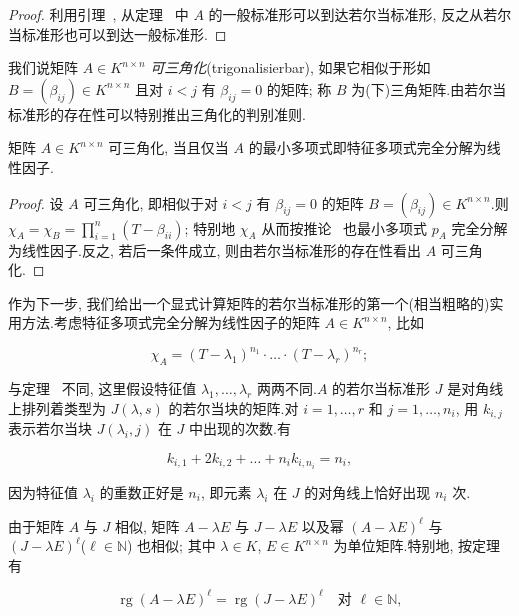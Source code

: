 \begin{proof}
利用引理~, 从定理~ 中 $A$ 的一般标准形可以到达若尔当标准形, 反之从若尔当标准形也可以到达一般标准形.
\end{proof}

我们说矩阵 $A \in K^{n \times n}$ \emph{可三角化}(\textup{trigonalisierbar}), 如果它相似于形如 $B = (\beta_{ij}) \in K^{n \times n}$ 且对 $i < j$ 有 $\beta_{ij} = 0$ 的矩阵; 称 $B$ 为(下)三角矩阵.由若尔当标准形的存在性可以特别推出三角化的判别准则.

\begin{corollary}\label{cor:6.5.16}
矩阵 $A \in K^{n \times n}$ 可三角化, 当且仅当 $A$ 的最小多项式即特征多项式完全分解为线性因子.
\end{corollary}

\begin{proof}
设 $A$ 可三角化, 即相似于对 $i < j$ 有 $\beta_{ij} = 0$ 的矩阵 $B = (\beta_{ij}) \in K^{n \times n}$.则 $\chi_A = \chi_B = \prod_{i = 1}^{n}(T - \beta_{ii})$; 特别地 $\chi_A$ 从而按推论~ 也最小多项式 $p_A$ 完全分解为线性因子.反之, 若后一条件成立, 则由若尔当标准形的存在性看出 $A$ 可三角化.
\end{proof}

作为下一步, 我们给出一个显式计算矩阵的若尔当标准形的第一个(相当粗略的)实用方法.考虑特征多项式完全分解为线性因子的矩阵 $A \in K^{n \times n}$, 比如

\[
\chi_A = (T - \lambda_1)^{n_1} \cdot \ldots \cdot (T - \lambda_r)^{n_r};\]

与定理~ 不同, 这里假设特征值 $\lambda_1, \ldots, \lambda_r$ 两两不同.$A$ 的若尔当标准形 $J$ 是对角线上排列着类型为 $J(\lambda, s)$ 的若尔当块的矩阵.对 $i = 1, \ldots, r$ 和 $j = 1, \ldots, n_i$, 用 $k_{i, j}$ 表示若尔当块 $J(\lambda_i, j)$ 在 $J$ 中出现的次数.有

\[
k_{i, 1} + 2 k_{i, 2} + \ldots + n_i k_{i, n_i} = n_i,\]

因为特征值 $\lambda_i$ 的重数正好是 $n_i$, 即元素 $\lambda_i$ 在 $J$ 的对角线上恰好出现 $n_i$ 次.

由于矩阵 $A$ 与 $J$ 相似, 矩阵 $A - \lambda E$ 与 $J - \lambda E$ 以及幂 $(A - \lambda E)^\ell$ 与 $(J - \lambda E)^\ell$($\ell \in \mathbb{N}$) 也相似; 其中 $\lambda \in K$, $E \in K^{n \times n}$ 为单位矩阵.特别地, 按定理~ 有

\[
\operatorname{rg}(A - \lambda E)^\ell = \operatorname{rg}(J - \lambda E)^\ell \quad \text{对 } \ell \in \mathbb{N},\]

